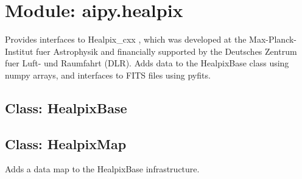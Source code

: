 \section{Module: aipy.healpix}

Provides interfaces to Healpix\_cxx \cite{gorski1999,gorski2005}, which was
developed at the Max-Planck-Institut fuer Astrophysik and financially
supported by the Deutsches Zentrum fuer Luft- und Raumfahrt (DLR).  Adds data
to the HealpixBase class using numpy arrays, and interfaces to FITS files
using pyfits.

\subsection{Class: HealpixBase}

\subsection{Class: HealpixMap}

Adds a data map to the HealpixBase infrastructure.

